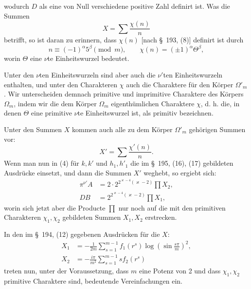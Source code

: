 \documentclass[11pt]{article}
\begin{document}
wodurch $D$ als eine von Null verschiedene positive Zahl definirt ist. Was die Summen
\[
X=\sum\frac{\chi(n)}{n}
\]
betrifft, so ist daran zu erinnern, dass $\chi(n)$ [nach \S~193, (8)] definirt ist durch
\begin{equation}
n\equiv(-1)^\alpha5^\beta\pmod m,
\qquad
\chi(n)=(\pm1)^\alpha\Theta^\beta,
\tag{7}
\end{equation}
worin $\Theta$ eine $\nu$te Einheitswurzel bedeutet.

Unter den $\nu$ten Einheitswurzeln sind aber auch die $\nu'$ten Einheitswurzeln enthalten, und unter den Charakteren $\chi$ auch die Charaktere für den Körper $\Omega'_m$. Wir unterscheiden demnach primitive und imprimitive Charaktere des Körpers $\Omega_m$, indem wir die dem Körper $\Omega_m$ eigenthümlichen Charaktere $\chi$, d. h. die, in denen $\Theta$ eine primitive $\nu$te Einheitswurzel ist, als primitiv bezeichnen.

Unter den Summen $X$ kommen auch alle zu dem Körper $\Omega'_m$ gehörigen Summen vor:
\[
X'=\sum\frac{\chi'(n)}{n}.
\]
Wenn man nun in (4) für $k,k'$ und $h_1,h'_1$ die im \S~195, (16), (17) gebildeten Ausdrücke einsetzt, und dann die Summen $X'$ weghebt, so ergiebt sich:
\begin{equation}
\begin{aligned}
\pi^{\nu'}A&=2\cdot2^{2^{\varkappa-4}(\varkappa-2)}\prod X_2,\\
DB&=2^{2^{\varkappa-4}(\varkappa-2)}\prod X_1,
\end{aligned}
\tag{8}
\end{equation}
worin sich jetzt aber die Producte $\prod$ nur noch auf die mit den primitiven Charakteren $\chi_1,\chi_2$ gebildeten Summen $X_1,X_2$ erstrecken.

In den im \S~194, (12) gegebenen Ausdrücken für die $X$:
\begin{equation}
\begin{aligned}
X_1&=-\frac1{2m}\sum_{s=1}^{m-1} f_1(r^s)\log\left(\sin\frac{s\pi}{m}\right)^2,\\
X_2&=-\frac{i\pi}{m^2}\sum_{s=1}^{m-1}s f_2(r^s)
\end{aligned}
\tag{9}
\end{equation}
treten nun, unter der Voraussetzung, dass $m$ eine Potenz von 2 und dass $\chi_1,\chi_2$ primitive Charaktere sind, bedeutende Vereinfachungen ein.
\end{document}
